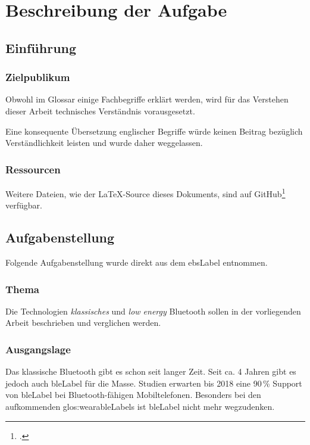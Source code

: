\chapter{Beschreibung der Aufgabe}

\section{Einführung}
\subsection{Zielpublikum}
Obwohl im Glossar einige Fachbegriffe erklärt werden, wird für das Verstehen dieser Arbeit technisches Verständnis vorausgesetzt.

Eine konsequente Übersetzung englischer Begriffe würde keinen Beitrag bezüglich Verständlichkeit leisten und wurde daher weggelassen.

\subsection{Ressourcen}
Weitere Dateien, wie der \LaTeX-Source dieses Dokuments, sind auf GitHub\footcite{GitHub_ble-seminar_2015-04-17} verfügbar.

\section{Aufgabenstellung}
Folgende Aufgabenstellung wurde direkt aus dem \gls{ebsLabel} entnommen.

\subsection{Thema}
Die Technologien \textit{klassisches} und \textit{low energy} Bluetooth sollen in der vorliegenden Arbeit beschrieben und verglichen werden.

\subsection{Ausgangslage}
Das klassische Bluetooth gibt es schon seit langer Zeit.
Seit ca. 4 Jahren gibt es jedoch auch \gls{bleLabel} für die Masse. Studien erwarten bis 2018 eine 90\,\% Support von \gls{bleLabel} bei Bluetooth-fähigen Mobiltelefonen.
Besonders bei den aufkommenden \glspl{glos:wearableLabel} ist \gls{bleLabel} nicht mehr wegzudenken.

